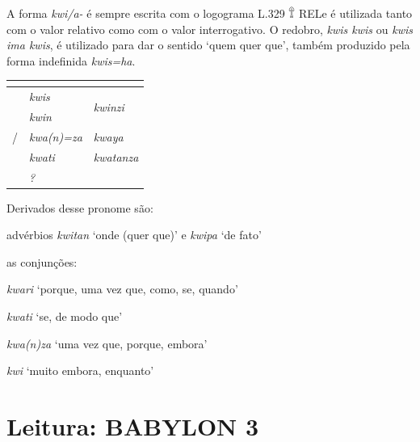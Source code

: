 A forma \emph{kwi\slash{}a-} é sempre escrita com o logograma L.329 𔕰 REL\@ e
é utilizada tanto com o valor relativo como com o valor interrogativo.
O redobro, \emph{kwis kwis} ou \emph{kwis ima kwis}, é utilizado para dar o
sentido `quem quer que', também produzido pela forma indefinida \emph{kwis=ha}.

\begin{center}
	\begin{tabular}[c]{lll}
		\toprule
		                 & \Sg{}\emph{}       & \Pl{}\emph{}                     \\
		\midrule
		\Nom{} \Com{}    & \emph{kwis}        & \multirow{2}{4em}{\emph{kwinzi}} \\
		\Acu{} \Com{}    & \emph{kwin}        &                                  \\
		\Nom/\Acu\Neut{} & \emph{kwa{(n)}=za} & \emph{kwaya}                     \\
		\Dat{}           & \emph{kwati}       & \emph{kwatanza}                  \\
		\Abl{}           & \emph{?}           & \emph{}                          \\
		\bottomrule
	\end{tabular}
\end{center}

\noindent Derivados desse pronome são:
\begin{compactitem}
	\item advérbios \emph{kwitan} `onde (quer que)' e \emph{kwipa} `de fato'
	\item as conjunções:
	\begin{compactitem}
		\item \emph{kwari} `porque, uma vez que, como, se, quando'
		\item \emph{kwati} `se, de modo que'
		\item \emph{kwa{(n)}za} `uma vez que, porque, embora'
		\item \emph{kwi} `muito embora, enquanto'
	\end{compactitem}
\end{compactitem}


\clearpage

\chapter{Leitura: BABYLON 3}

